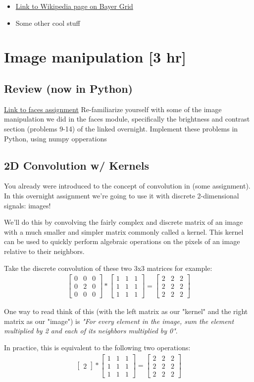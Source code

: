 \documentclass{tufte-handout}
\newcommand{\threebythree}[9]{\ensuremath{\begin{bmatrix} #1 & #2 & #3 \\ #4 & #5 & #6 \\ #7 & #8 & #9 \end{bmatrix}}}
\begin{document}
\begin{itemize}
\item \href{https://en.wikipedia.org/wiki/Bayer_filter
}{Link to Wikipedia page on Bayer Grid}
\item Some other cool stuff
\end{itemize}

\section{Image manipulation [3 hr]}

\subsection{Review (now in Python)}
\href{https://drive.google.com/file/d/0B7LNBbaxYFujOHpEU2FDdkF6VEE/view
}{Link to faces assignment}
Re-familiarize yourself with some of the image manipulation we did in the faces module, specifically the brightness and contrast section (problems 9-14) of the linked overnight. Implement these problems in Python, using numpy opperations

\subsection{2D Convolution w/ Kernels}  %

You already were introduced to the concept of convolution in (some assignment). In this overnight assignment we're going to use it with discrete 2-dimensional signals: images!

We'll do this by convolving the fairly complex and discrete matrix of an image with a much smaller and simpler matrix commonly called a kernel. This kernel can be used to quickly perform algebraic operations on the pixels of an image relative to their neighbors.

Take the discrete convolution of these two 3x3 matrices for example:
\begin{align}
    \threebythree{0}{0}{0}{0}{2}{0}{0}{0}{0} * \threebythree{1}{1}{1}{1}{1}{1}{1}{1}{1} =
    \threebythree{2}{2}{2}{2}{2}{2}{2}{2}{2}
\end{align}

One way to read think of this (with the left matrix as our "kernel" and the right matrix as our "image") is \emph{"For every element in the image, sum the element multiplied by 2 and each of its neighbors multiplied by 0"}.

In practice, this is equivalent to the following two operations:
\begin{align}\label{eqn:convolution1}
    \begin{bmatrix}2\end{bmatrix} * \threebythree{1}{1}{1}{1}{1}{1}{1}{1}{1} =
    \threebythree{2}{2}{2}{2}{2}{2}{2}{2}{2}
\end{align}
\end{document}
